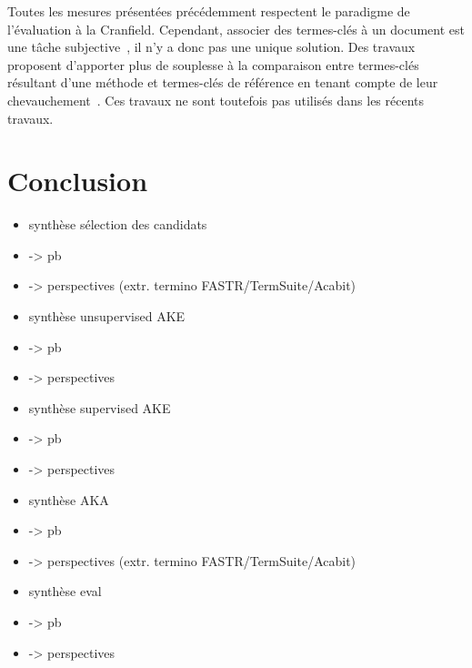     Toutes les mesures présentées précédemment respectent le paradigme de
    l'évaluation \og{}à la Cranfield\fg{}. Cependant, associer des termes-clés à
    un document est une tâche subjective~\cite{hasan2014state_of_the_art}, il
    n'y a donc pas une unique solution. Des travaux proposent d'apporter plus de
    souplesse à la comparaison entre termes-clés résultant d'une méthode et
    termes-clés de référence en tenant compte de leur
    chevauchement~\cite{zesch2009rprecision,kim2010rprecision}. Ces travaux
    ne sont toutefois pas utilisés dans les récents travaux.

  \section{Conclusion}
  \label{sec:main-state_of_the_art-automatic_evaluation_of_keyphrase_annotation-conclusion}
    \begin{itemize}
      \item{synthèse sélection des candidats}
      \item{-> pb}
      \item{-> perspectives (extr. termino FASTR/TermSuite/Acabit)}
      \item{synthèse unsupervised AKE}
      \item{-> pb}
      \item{-> perspectives}
      \item{synthèse supervised AKE}
      \item{-> pb}
      \item{-> perspectives}
      \item{synthèse AKA}
      \item{-> pb}
      \item{-> perspectives (extr. termino FASTR/TermSuite/Acabit)}
      \item{synthèse eval}
      \item{-> pb}
      \item{-> perspectives}
    \end{itemize}

